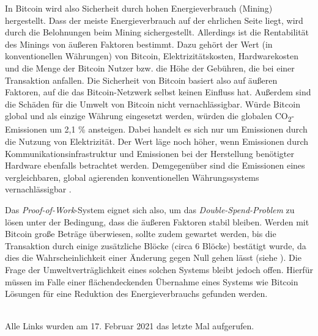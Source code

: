 \documentclass[ngerman,runningheads,a4paper]{llncs}[2018/03/10]
\begin{document}
In Bitcoin wird also Sicherheit durch hohen Energieverbrauch (Mining) hergestellt. Dass der meiste Energieverbrauch auf der ehrlichen Seite liegt, wird durch die Belohnungen beim Mining sichergestellt. Allerdings ist die Rentabilität des Minings von äußeren Faktoren bestimmt. Dazu gehört der Wert (in konventionellen Währungen) von Bitcoin, Elektrizitätskosten, Hardwarekosten und die Menge der Bitcoin Nutzer bzw. die Höhe der Gebühren, die bei einer Transaktion anfallen. Die Sicherheit von Bitcoin basiert also auf äußeren Faktoren, auf die das Bitcoin-Netzwerk selbst keinen Einfluss hat. Außerdem sind die Schäden für die Umwelt von Bitcoin nicht vernachlässigbar. Würde Bitcoin global und als einzige Währung eingesetzt werden, würden die globalen CO\textsubscript{2}-Emissionen um 2,1 \% ansteigen. Dabei handelt es sich nur um Emissionen durch die Nutzung von Elektrizität. Der Wert läge noch höher, wenn Emissionen durch Kommunikationsinfrastruktur und Emissionen bei der Herstellung benötigter Hardware ebenfalls betrachtet werden. Demgegenüber sind die Emissionen eines vergleichbaren, global agierenden konventionellen Währungssystems vernachlässigbar \citep{Becker2013}. 

Das \textit{Proof-of-Work}-System eignet sich also, um das \textit{Double-Spend-Problem} zu lösen unter der Bedingung, dass die äußeren Faktoren stabil bleiben. Werden mit Bitcoin große Beträge überwiesen, sollte zudem gewartet werden, bis die Transaktion durch einige zusätzliche Blöcke (circa 6 Blöcke) bestätigt wurde, da dies die Wahrscheinlichkeit einer Änderung gegen Null gehen lässt (siehe ). Die Frage der Umweltverträglichkeit eines solchen Systems bleibt jedoch offen. Hierfür müssen im Falle einer flächendeckenden Übernahme eines Systems wie Bitcoin Lösungen für eine Reduktion des Energieverbrauchs gefunden werden. 

\renewcommand{\bibsection}{\section*{Referenzen}} %

\begingroup
  \ifluatex
  \else
  \fi
  \small %
  
\endgroup

\ \\
%
Alle Links wurden am 17. Februar 2021 das letzte Mal aufgerufen.
\end{document}
